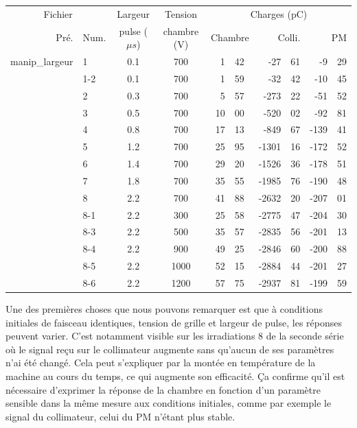 \documentclass[a4paper,11pt]{article}
\begin{document}
\begin{center}
\begin{tabular}{rl|cc|r@{.}lr@{.}lr@{.}l}
\multicolumn{2}{c|}{Fichier}&Largeur&Tension&\multicolumn{6}{c}{Charges (pC)}\\
Pré.&Num.&pulse ($\mu s$)&chambre (V)&\multicolumn{2}{r}{Chambre}&\multicolumn{2}{r}{Colli.}&\multicolumn{2}{r}{PM}\\
\hline
\hline
manip\_largeur&1&0.1&700&\hspace*{3ex}1&42&-27&61&-9&29\\
&1-2&0.1&700&1&59&-32&42&-10&45\\
&2&0.3&700&5&57&-273&22&-51&52\\
&3&0.5&700&10&00&-520&02&-92&81\\
&4&0.8&700&17&13&-849&67&-139&41\\
&5&1.2&700&25&95&-1301&16&-172&52\\
&6&1.4&700&29&20&-1526&36&-178&51\\
&7&1.8&700&35&55&-1985&76&-190&48\\
&8&2.2&700&41&88&-2632&20&-207&01\\
&8-1&2.2&300&25&58&-2775&47&-204&30\\
&8-3&2.2&500&35&57&-2835&56&-201&13\\
&8-4&2.2&900&49&25&-2846&60&-200&88\\
&8-5&2.2&1000&52&15&-2884&44&-201&27\\
&8-6&2.2&1200&57&75&-2937&81&-199&59\\
\hline
\end{tabular}
\end{center}

Une des premières choses que nous pouvons remarquer est que à conditions initiales de faisceau identiques, tension de grille et largeur de pulse, les réponses peuvent varier.
C'est notamment visible sur les irradiations 8 de la seconde série où le signal reçu sur le collimateur augmente sans qu'aucun de ses paramètres n'ai été changé.
Cela peut s'expliquer par la montée en température de la machine au cours du temps, ce qui augmente son efficacité.
Ça confirme qu'il est nécessaire d'exprimer la réponse de la chambre en fonction d'un paramètre sensible dans la même mesure aux conditions initiales, comme par exemple le signal du collimateur, celui du PM n'étant plus stable.
\end{document}
